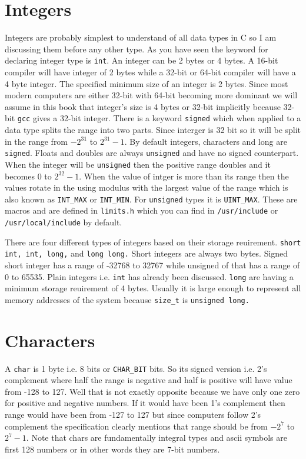 \section{Integers}
Integers are probably simplest to understand of all data types in C so I am
discussing them before any other type. As you have seen the keyword for
declaring integer type is \texttt{int}. An integer can be 2 bytes or 4 bytes. A
16-bit compiler will have integer of 2 bytes while a 32-bit or 64-bit compiler
will have a 4 byte integer. The specified minimum size of an integer is 2
bytes. Since most modern computers are either 32-bit with
64-bit becoming more dominant we will assume in this book that integer's size
is 4 bytes or 32-bit implicitly because 32-bit \texttt{gcc} gives a 32-bit
integer. There is a keyword \texttt{signed} which when 
applied to a data type splits the range into two parts. Since interger is 32
bit so it will be split in the range from $-2^{31}$ to $2^{31} - 1$. By default
integers, characters and long are \texttt{signed}. Floats and doubles are
always \texttt{unsigned} and have no signed counterpart. When the integer will
be \texttt{unsigned} then the positive range doubles and it becomes $0$ to
$2^{32} - 1$. When the value of intger is more than its range then the values
rotate in the using modulus with the largest value of the range which is also
known as \texttt{INT\_MAX} or \texttt{INT\_MIN}. For \texttt{unsigned} types it
is \texttt{UINT\_MAX}. These are macros and are defined in \texttt{limits.h}
which you can find in \texttt{/usr/include} or \texttt{/usr/local/include} by
default.

There are four different types of integers based on their storage
reuirement. \texttt{short int, int, long,} and \texttt{long long.} Short
integers are always two bytes. Signed short integer has a range of -32768 to
32767 while unsigned of that has a range of 0 to 65535. Plain integers
i.e. \texttt{int} has already been discussed. \texttt{long} are having a
minimum storage reuirement of 4 bytes. Usually it is large enough to represent
all memory addresses of the system because \texttt{size\_t} is
\texttt{unsigned long.}

\section{Characters}
A \texttt{char} is 1 byte i.e. 8 bits or \texttt{CHAR\_BIT} bits. So its signed
version i.e. 2's 
complement where half the range is negative and half is positive will have
value from -128 to 127. Well that is not exactly opposite because we have only
one zero for positive and negative numbers. If it would have been 1's
complement then range would have been from -127 to 127 but since computers
follow 2's complement the specification clearly mentions that range should be
from $-2^7$ to $2^7 - 1.$ Note that chars are fundamentally integral types and
ascii symbols are first 128 numbers or in other words they are 7-bit numbers.

